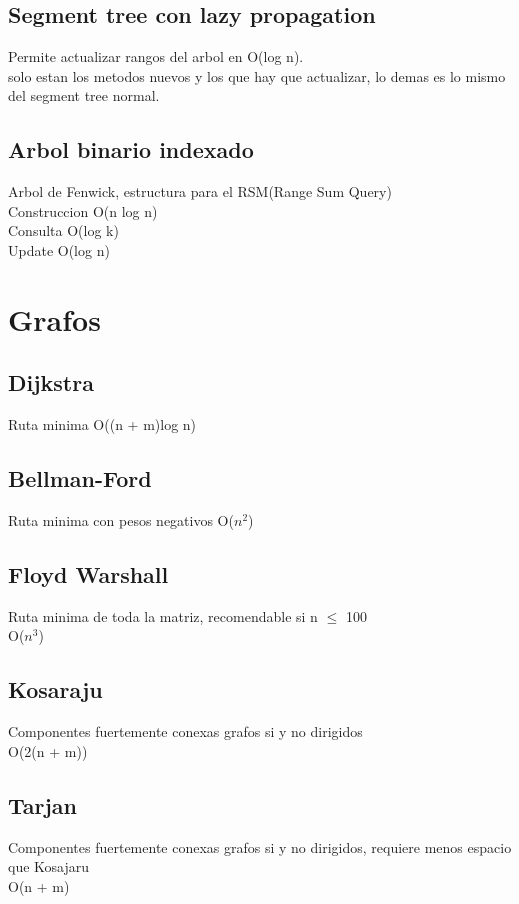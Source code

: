 \documentclass[10pt,landscape,twocolumn,a4paper,notitlepage]{article}
\newcommand\cppfile[2][]{

}
\begin{document}
			\subsection{Segment tree con lazy propagation}
			Permite actualizar rangos del arbol en O(log n).\\
			solo estan los metodos nuevos y los que hay que actualizar, 
			lo demas es lo mismo del segment tree normal.
			\cppfile[29-84]{estructuras_de_datos/segment_tree_lazy_propagation.cpp}
			\subsection{Arbol binario indexado}
			Arbol de Fenwick, estructura para el RSM(Range Sum Query)\\
			Construccion O(n log n) \\Consulta O(log k)\\Update O(log n)
			\cppfile[8-39]{estructuras_de_datos/arbol_binario_indexado.cpp}
			
		\section{Grafos}
			\subsection{Dijkstra}
			Ruta minima
			O((n + m)log n)
			\cppfile[7-50]{grafos/dijkstra.cpp}
			\subsection{Bellman-Ford}
			Ruta minima con pesos negativos
			O($n^{2}$)
			\cppfile[5-37]{grafos/bellman-Ford.cpp}
			\subsection{Floyd Warshall}
			Ruta minima de toda la matriz, recomendable si n $\leq$ 100\\	
			O($n^{3}$)
			\cppfile[4-19]{grafos/floyd.cpp}
			\subsection{Kosaraju}
			Componentes fuertemente conexas grafos si y no dirigidos\\
			O(2(n + m))
			\cppfile[9-44]{grafos/kosaraju.cpp}
			\subsection{Tarjan}
			Componentes fuertemente conexas grafos si y no dirigidos, requiere menos
			espacio que Kosajaru\\
			O(n + m)
			\cppfile[9-39]{grafos/tarjan.cpp}
\end{document}
